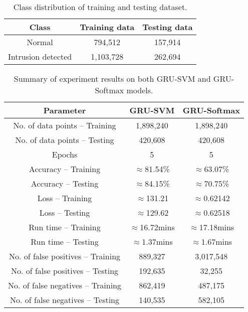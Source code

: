 \begin{table}
\centering
\caption{Class distribution of training and testing dataset.}
\label{class-distribution}
	\begin{tabular}{ccc}
	\toprule
	Class & Training data & Testing data \\
	\midrule
	Normal & 794,512 & 157,914\\
	Intrusion detected & 1,103,728 & 262,694\\
	\bottomrule
	\end{tabular}
\end{table}
\begin{table}
\centering
\caption{Summary of experiment results on both GRU-SVM and GRU-Softmax models.}
		\begin{tabular}{ccc}
		\toprule
		Parameter & GRU-SVM & GRU-Softmax \\
		\midrule
		No. of data points -- Training & 1,898,240 & 1,898,240\\
		No. of data points -- Testing & 420,608 & 420,608 \\
		Epochs & 5 & 5\\
		Accuracy -- Training & $\approx$81.54\% & $\approx$63.07\%\\
		Accuracy -- Testing & $\approx$84.15\% & $\approx$70.75\%\\
		Loss -- Training &  $\approx$131.21& $\approx$0.62142\\
		Loss -- Testing & $\approx$129.62 & $\approx$0.62518\\
		Run time -- Training & $\approx$16.72mins & $\approx$17.18mins\\
		Run time -- Testing & $\approx$1.37mins & $\approx$1.67mins \\
		No. of false positives -- Training & 889,327 & 3,017,548\\
		No. of false positives -- Testing & 192,635 & 32,255\\
		No. of false negatives -- Training & 862,419 & 487,175\\
		No. of false negatives -- Testing & 140,535& 582,105\\
		\bottomrule
		\end{tabular}\\
		\label{table: summary-results}
\end{table}

